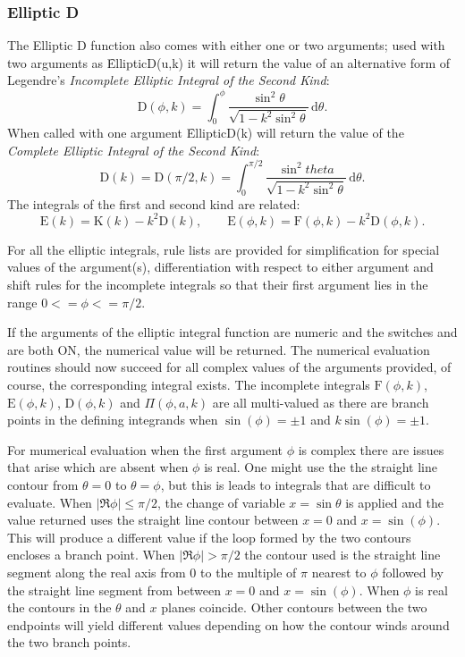 \subsubsection{Elliptic D}
\hypertarget{operator:ELLIPTICD}{}

The Elliptic D function also comes with either one or two arguments;
used with two arguments as \f{EllipticD(u,k)}
it will return the value of an alternative form of Legendre's 
\emph{Incomplete Elliptic Integral of the Second Kind}:
\[\mathrm{D}(\phi, k)=\int_0^\phi\frac{\sin^2 \theta}{\sqrt{1-k^2\sin^2\theta}}
\,\mathrm{d}\theta.\]
When called with one argument \f{EllipticD(k)} will return the value of the
\emph{Complete Elliptic Integral of the Second Kind}:
\[\mathrm{D}(k)=\mathrm{D}(\pi/2, k) =
\int_0^{\pi/2} \frac{\sin^2 theta}{\sqrt{1-k^2 \sin^2 \theta}} \,\mathrm{d}\theta.\]
The integrals of the first and second kind are related:
\[\mathrm{E}(k) = \mathrm{K}(k)-k^2\mathrm{D}(k), \qquad
\mathrm{E}(\phi, k) = \mathrm{F}(\phi, k)-k^2\mathrm{D}(\phi, k).\]

For all the elliptic integrals, rule lists are provided for simplification for
special values of the argument(s), differentiation with respect to either
argument and shift rules for the incomplete integrals so that their first
argument lies in the range  $0 <= \phi <= \pi/2$.

If the arguments of the elliptic integral function are numeric and the switches
 and  are both ON, the numerical value will be returned. The
numerical evaluation routines should now succeed for all complex values of the arguments
provided, of course, the corresponding integral exists. The incomplete integrals
$\mathrm{F}(\phi, k)$, $\mathrm{E}(\phi, k)$, $\mathrm{D}(\phi, k)$ and $\Pi(\phi, a, k)$
are all multi-valued as there are branch points in the  defining integrands  when
$\sin(\phi) =\pm 1$ and $k\sin(\phi) = \pm 1$.

For mumerical evaluation when the first argument $\phi$ is complex there are issues that
arise which are absent when $\phi$ is real. One might use the the straight line contour
from $\theta=0$ to $\theta=\phi$, but this is leads to integrals that are difficult to
evaluate. When $|\Re{\phi}| \leq \pi/2$, the change of variable $x=\sin \theta$ is applied
and the value returned uses the straight line contour between $x=0$ and $x=\sin(\phi)$.
This will  produce a different value if the loop formed by the two contours encloses a
branch point. When $|\Re{\phi}| > \pi/2$ the contour used is the straight line segment
along the real axis from 0 to the multiple of $\pi$ nearest to $\phi$ followed by the
straight line segment from between $x=0$ and $x=\sin(\phi)$. When $\phi$ is real the
contours in the $\theta$ and $x$ planes coincide. Other contours between the
two endpoints will yield different values depending on how the contour winds around the
two branch points.

